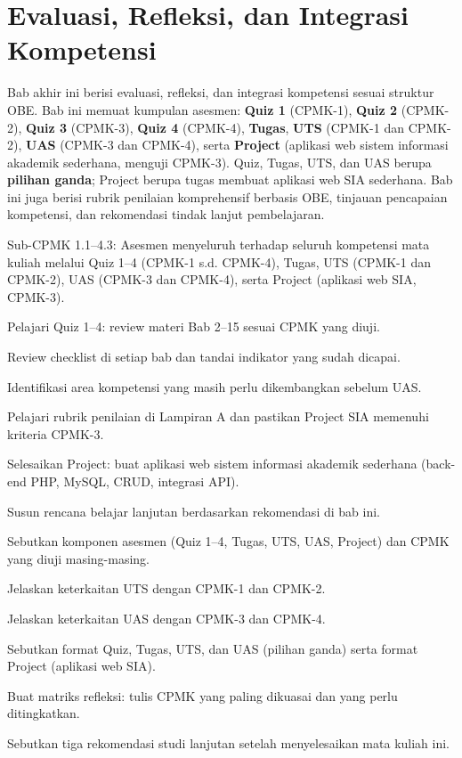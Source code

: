 \documentclass[../main.tex]{subfiles}
\begin{document}
\chapter{Evaluasi, Refleksi, dan Integrasi Kompetensi}

Bab akhir ini berisi evaluasi, refleksi, dan integrasi kompetensi sesuai struktur OBE. Bab ini memuat kumpulan asesmen: \textbf{Quiz 1} (CPMK-1), \textbf{Quiz 2} (CPMK-2), \textbf{Quiz 3} (CPMK-3), \textbf{Quiz 4} (CPMK-4), \textbf{Tugas}, \textbf{UTS} (CPMK-1 dan CPMK-2), \textbf{UAS} (CPMK-3 dan CPMK-4), serta \textbf{Project} (aplikasi web sistem informasi akademik sederhana, menguji CPMK-3). Quiz, Tugas, UTS, dan UAS berupa \textbf{pilihan ganda}; Project berupa tugas membuat aplikasi web SIA sederhana. Bab ini juga berisi rubrik penilaian komprehensif berbasis OBE, tinjauan pencapaian kompetensi, dan rekomendasi tindak lanjut pembelajaran.

\begin{subcpmk}
  \item Sub-CPMK 1.1--4.3: Asesmen menyeluruh terhadap seluruh kompetensi mata kuliah melalui Quiz 1--4 (CPMK-1 s.d. CPMK-4), Tugas, UTS (CPMK-1 dan CPMK-2), UAS (CPMK-3 dan CPMK-4), serta Project (aplikasi web SIA, CPMK-3).
\end{subcpmk}



\begin{aktivitas}
  \item Pelajari Quiz 1--4: review materi Bab 2--15 sesuai CPMK yang diuji.
  \item Review checklist di setiap bab dan tandai indikator yang sudah dicapai.
  \item Identifikasi area kompetensi yang masih perlu dikembangkan sebelum UAS.
  \item Pelajari rubrik penilaian di Lampiran A dan pastikan Project SIA memenuhi kriteria CPMK-3.
  \item Selesaikan Project: buat aplikasi web sistem informasi akademik sederhana (back-end PHP, MySQL, CRUD, integrasi API).
  \item Susun rencana belajar lanjutan berdasarkan rekomendasi di bab ini.
\end{aktivitas}

\begin{latihan}
  \item Sebutkan komponen asesmen (Quiz 1--4, Tugas, UTS, UAS, Project) dan CPMK yang diuji masing-masing.
  \item Jelaskan keterkaitan UTS dengan CPMK-1 dan CPMK-2.
  \item Jelaskan keterkaitan UAS dengan CPMK-3 dan CPMK-4.
  \item Sebutkan format Quiz, Tugas, UTS, dan UAS (pilihan ganda) serta format Project (aplikasi web SIA).
  \item Buat matriks refleksi: tulis CPMK yang paling dikuasai dan yang perlu ditingkatkan.
  \item Sebutkan tiga rekomendasi studi lanjutan setelah menyelesaikan mata kuliah ini.
\end{latihan}
\end{document}
